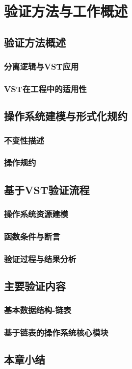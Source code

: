 \chapter{验证方法与工作概述}
\section{验证方法概述}
\subsection{分离逻辑与VST应用}
\subsection{VST在工程中的适用性}
\section{操作系统建模与形式化规约}
\subsection{不变性描述}
\subsection{操作规约}
\section{基于VST验证流程}
\subsection{操作系统资源建模}
\subsection{函数条件与断言}
\subsection{验证过程与结果分析}
\section{主要验证内容}
\subsection{基本数据结构-链表}
\subsection{基于链表的操作系统核心模块}
\section{本章小结}
